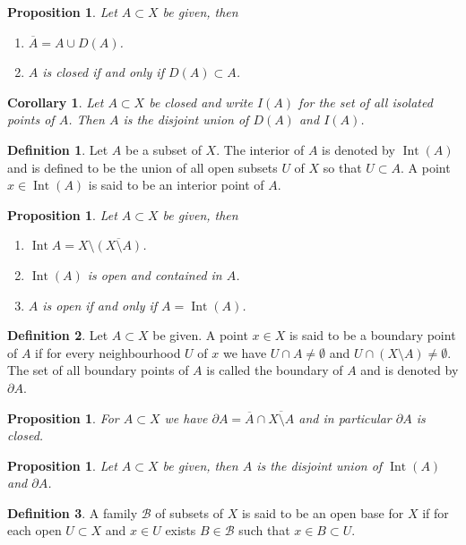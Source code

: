 \documentclass[11pt,a4paper]{article}
\theoremstyle{definition}
\newtheorem{definition}{Definition}[section]
\theoremstyle{plain}
\newtheorem{proposition}[theorem]{Proposition}
\newtheorem{corollary}[theorem]{Corollary}
\DeclareMathOperator{\Int}{Int}
\begin{document}
	\begin{proposition}
		Let $A \subset X$ be given, then
		\begin{enumerate}
			\item $\overline{A} = A \cup D(A)$.
			\item $A$ is closed if and only if $D(A) \subset A$.
		\end{enumerate}
	\end{proposition}
	\begin{corollary}
		Let $A \subset X$ be closed and write $I(A)$ for the set of all isolated
		points of $A$. Then $A$ is the disjoint union of $D(A)$ and $I(A)$.
	\end{corollary}
	\begin{definition}
		Let $A$ be a subset of $X$. The interior of $A$ is denoted by $\Int(A)$
		and is defined to be the union of all open subsets $U$ of $X$ so that 
		$U \subset A$. A point $x \in \Int(A)$ is said to be an interior point 
		of $A$.
	\end{definition}
	\begin{proposition}
		Let $A \subset X$ be given, then
		\begin{enumerate}
			\item $\Int{A} = X \setminus \overline{(X \setminus A)}$.
			\item $\Int(A)$ is open and contained in $A$.
			\item $A$ is open if and only if $A = \Int(A)$.
		\end{enumerate}
	\end{proposition}
	\begin{definition}
		Let $A \subset X$ be given. A point $x \in X$ is said to be a boundary
		point of $A$ if for every neighbourhood $U$ of $x$ we have 
		$U \cap A \neq \emptyset$ and $U \cap (X \setminus A) \neq \emptyset$.
		The set of all boundary points of $A$ is called the boundary of $A$ and 
		is denoted by $\partial A$.
	\end{definition}
	\begin{proposition}
		For $A \subset X$ we have 
		$\partial A = \overline{A} \cap \overline{X \setminus A}$ and in 
		particular $\partial A$ is closed.
	\end{proposition}
	\begin{proposition}
		Let $A \subset X$ be given, then $A$ is the disjoint union of $\Int(A)$
		and $\partial A$.
	\end{proposition}
	\begin{definition}
		A family $\mathcal{B}$ of subsets of $X$ is said to be an open base
		for $X$ if for each open $U \subset X$ and $x \in U$ exists 
		$B \in \mathcal{B}$ such that $x \in B \subset U$.
	\end{definition}
\end{document}
